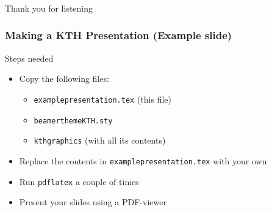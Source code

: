 \documentclass[aspectratio=1610]{beamer}
\begin{document}
\begin{frame}
  \frametitle{\hfill }
  Thank you for listening
\end{frame}



\begin{frame}
  \frametitle{\hfill Making a KTH Presentation (Example slide)}

  \begin{block}{Steps needed}
    \begin{itemize}
    \item Copy the following files:
    \begin{itemize}
    \item \texttt{examplepresentation.tex} (this file)
    \item \texttt{beamerthemeKTH.sty}
    \item \texttt{kthgraphics} (with all its contents)
    \end{itemize}
    \item Replace the contents in \texttt{examplepresentation.tex} with your own
    \item Run \texttt{pdflatex} a couple of times
    \item Present your slides using a PDF-viewer
    \end{itemize}
  \end{block}

\end{frame}
\end{document}
